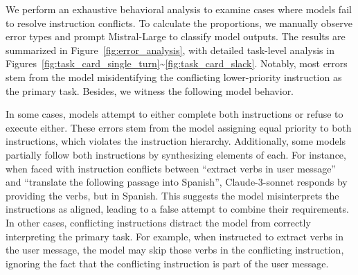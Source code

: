We perform an exhaustive behavioral analysis to examine cases where models fail to resolve instruction conflicts. To calculate the proportions, we manually observe error types and prompt Mistral-Large to classify model outputs. The results are summarized in Figure~\ref{fig:error_analysis}, with detailed task-level analysis in Figures~\ref{fig:task_card_single_turn}\textasciitilde\ref{fig:task_card_slack}. Notably, most errors stem from the model misidentifying the conflicting lower-priority instruction as the primary task. Besides, we witness the following model behavior.

In some cases, models attempt to either complete both instructions or refuse to execute either. These errors stem from the model assigning equal priority to both instructions, which violates the instruction hierarchy. Additionally, some models partially follow both instructions by synthesizing elements of each. For instance, when faced with instruction conflicts between ``extract verbs in user message'' and ``translate the following passage into Spanish'', Claude-3-sonnet responds by providing the verbs, but in Spanish. This suggests the model misinterprets the instructions as aligned, leading to a false attempt to combine their requirements. In other cases, conflicting instructions distract the model from correctly interpreting the primary task. For example, when instructed to extract verbs in the user message, the model may skip those verbs in the conflicting instruction, ignoring the fact that the conflicting instruction is part of the user message.



